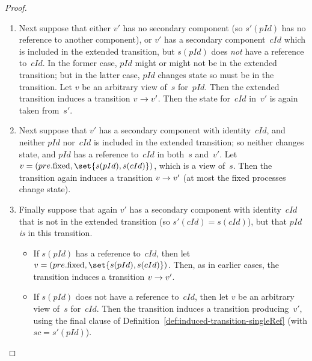 \begin{proof}
\begin{enumerate}
\begin{enumerate}
\item Next suppose that either $v'$ has no secondary component (so $s'(pId)$
  has no reference to another component), or $v'$ has a secondary
  component~$cId$ which is included in the extended transition, but $s(pId)$
  does \emph{not} have a reference to~$cId$.  In the former case, $pId$ might
  or might not be in the extended transition; but in the latter case, $pId$
  changes state so must be in the transition.  Let $v$ be an arbitrary view
  of~$s$ for~$pId$.  Then the extended transition induces a transition $v
  \stackrel{}\rightarrow v'$.  Then the state for~$cId$ in~$v'$ is again taken from~$s'$.


\item Next suppose that $v'$ has a secondary component with identity~$cId$,
  and neither $pId$ nor~$cId$ is included in the extended transition; so
  neither changes state, and $pId$ has a reference to~$cId$ in both~$s$
  and~$v'$.  Let $v = (pre.\fixed, \set{s(pId), s(cId)})$, which is a view
  of~$s$.  Then the transition again induces a transition $v \stackrel{}\rightarrow v'$ (at
  most the fixed processes change state).

\item Finally suppose that again $v'$ has a secondary component with
  identity~$cId$ that is not in the extended transition (so $s'(cId) =
  s(cId)$), but that $pId$ \emph{is} in this transition.
  \begin{itemize}
  \item If $s(pId)$ has a reference to~$cId$, then let $v =
    (pre.\fixed,\linebreak[1] \set{s(pId), s(cId)})$.  Then, as in earlier
    cases, the transition induces a transition $v \stackrel{}\rightarrow v'$.

  \item If $s(pId)$ does not have a reference to~$cId$, then let $v$ be an
    arbitrary view of~$s$ for~$cId$.  Then the transition induces a transition
    producing~$v'$, using the final clause of
    Definition~\ref{def:induced-transition-singleRef} (with $sc = s'(pId)$).
  \end{itemize}
\end{enumerate}


\end{enumerate}
\end{proof}
